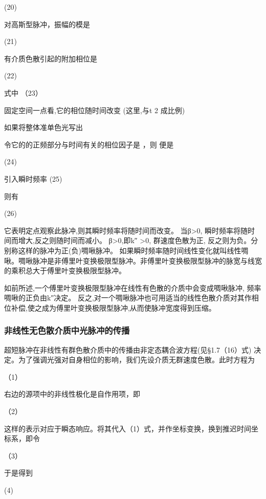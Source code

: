 (20)

对高斯型脉冲，振幅的模是

                                    (21)

有介质色散引起的附加相位是

                                  (22)
                                  
式中                                           （23）

固定空间一点看,它的相位随时间改变 (这里,与t 2 成比例)

如果将整体准单色光写出
        
令它的的正频部分与时间有关的相位因子是 ，则 便是

                                          (24)

引入瞬时频率                                             (25)

则有

                                                  (26)

它表明定点观察此脉冲,则其瞬时频率将随时间而改变。  当β>0, 瞬时频率将随时间而增大,反之则随时间而减小。 β>0,即k″ >0, 群速度色散为正, 反之则为负。分别称这样的脉冲为正(负)啁啾脉冲。 如果瞬时频率随时间线性变化就叫线性啁啾。啁啾脉冲是非傅里叶变换极限型脉冲。非傅里叶变换极限型脉冲的脉宽与线宽的乘积总大于傅里叶变换极限型脉冲。

如前所述,一个傅里叶变换极限型脉冲在线性有色散的介质中会变成啁啾脉冲, 频率啁啾的正负由k″决定。 反之,对一个啁啾脉冲也可用适当的线性色散介质对其作相位补偿,使之成为傅里叶变换极限型脉冲,从而使脉冲宽度得到压缩。

\subsubsection{非线性无色散介质中光脉冲的传播}
超短脉冲在非线性有群色散介质中的传播由非定态耦合波方程(见§1.7（16）式) 决定。为了强调光强对自身相位的影响，我们先设介质无群速度色散。此时方程为

           （1）

右边的源项中的非线性极化是自作用项，即

                     （2）

这样的表示对应于瞬态响应。将其代入（1）式，并作坐标变换，换到推迟时间坐标系，即令
                                              
（3）

于是得到

                               (4)

